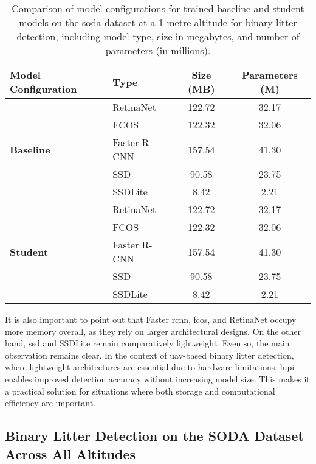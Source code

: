 \begin{table}[!ht]
    \centering
    \begin{tabular}{llcc}
        \toprule
        \textbf{Model Configuration} & \textbf{Type} & \textbf{Size (MB)} & \textbf{Parameters (M)} \\
        \midrule
        \multirow{5}{*}{\textbf{Baseline}} 
            & RetinaNet   & 122.72 & 32.17 \\
            & FCOS        & 122.32 & 32.06 \\
            & Faster R-CNN & 157.54 & 41.30 \\
            & SSD         & 90.58  & 23.75 \\
            & SSDLite     & 8.42   & 2.21 \\
        \midrule
        \multirow{5}{*}{\textbf{Student}} 
            & RetinaNet   & 122.72 & 32.17 \\
            & FCOS        & 122.32 & 32.06 \\
            & Faster R-CNN & 157.54 & 41.30 \\
            & SSD         & 90.58  & 23.75 \\
            & SSDLite     & 8.42   & 2.21 \\
        \bottomrule
    \end{tabular}
    \caption{Comparison of model configurations for trained baseline and student models on the \gls{soda} dataset at a 1-metre altitude for binary litter detection, including model type, size in megabytes, and number of parameters (in millions).}
    \label{tab:model_configs_soda01m}
\end{table}

It is also important to point out that Faster \gls{rcnn}, \gls{fcos}, and RetinaNet occupy more memory overall, as they rely on larger architectural designs. On the other hand, \gls{ssd} and SSDLite remain comparatively lightweight. Even so, the main observation remains clear. In the context of \gls{uav}-based binary litter detection, where lightweight architectures are essential due to hardware limitations, \gls{lupi} enables improved detection accuracy without increasing model size. This makes it a practical solution for situations where both storage and computational efficiency are important.

\subsection{Binary Litter Detection on the SODA Dataset Across All Altitudes}
\label{subsec:5_soda_tiled_single_dataset_exp}

